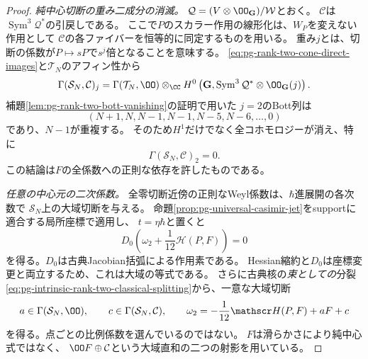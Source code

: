 \begin{proof}
\emph{純中心切断の重み二成分の消滅。}
$\mathcal Q=(V\otimes\OO_{\mathbf G})/\mathcal W$とおく。
$\mathcal C$は$\operatorname{Sym}^3\mathcal Q^*$の引戻しである。
ここで$P$のスカラー作用の線形化は、$W_P$を変えない作用として
$\mathcal C$の各ファイバーを恒等的に同定するものを用いる。
重み$j$とは、切断の係数が$P\mapsto sP$で$s^j$倍となることを意味する。
\eqref{eq:pg-rank-two-cone-direct-images}と$\mathcal T_N$のアフィン性から
\begin{equation}
 \Gamma(\mathcal S_N,\mathcal C)_j
 =\Gamma(\mathcal T_N,\OO)\otimes_\CC
 H^0\left(\mathbf G,
     \operatorname{Sym}^3\mathcal Q^*\otimes\OO_{\mathbf G}(j)\right).
 \label{eq:pg-intrinsic-pure-center-weight-sections}
\end{equation}
補題\ref{lem:pg-rank-two-bott-vanishing}の証明で用いた
$j=2$のBott列は
\begin{equation}
 (N+1,N,N-1,N-1,N-5,N-6,\ldots,0)
 \label{eq:pg-intrinsic-pure-center-weight-two-bott}
\end{equation}
であり、$N-1$が重複する。
そのため$H^1$だけでなく全コホモロジーが消え、特に
\begin{equation}
 \Gamma(\mathcal S_N,\mathcal C)_2=0.
 \label{eq:pg-intrinsic-pure-center-weight-two-zero}
\end{equation}
この結論は$F$の全係数への正則な依存を許したものである。

\emph{任意の中心元の二次係数。}
全零切断近傍の正則なWeyl係数は、$\hbar$進展開の各次数で
$\mathcal S_N$上の大域切断を与える。
命題\ref{prop:pg-universal-casimir-jet}をsupportに適合する局所座標で適用し、
$t=\eta\hbar$と置くと
\begin{equation}
 D_0\left(\omega_2+\frac1{12}\mathscr H(P,F)\right)=0
 \label{eq:pg-intrinsic-any-center-second-coefficient}
\end{equation}
を得る。$D_0$は古典Jacobian括弧による作用素である。
Hessian縮約と$D_0$は座標変更と両立するため、これは大域の等式である。
さらに古典核の\emph{束としての}分裂
\eqref{eq:pg-intrinsic-rank-two-classical-splitting}から、一意な大域切断
\begin{equation}
 a\in\Gamma(\mathcal S_N,\OO),\qquad
 c\in\Gamma(\mathcal S_N,\mathcal C),\qquad
 \omega_2=-\frac1{12}\mathscr H(P,F)+aF+c
 \label{eq:pg-intrinsic-any-center-second-decomposition}
\end{equation}
を得る。点ごとの比例係数を選んでいるのではない。
$F$は滑らかさにより純中心式ではなく、
$\OO F\oplus\mathcal C$という大域直和の二つの射影を用いている。


\end{proof}
